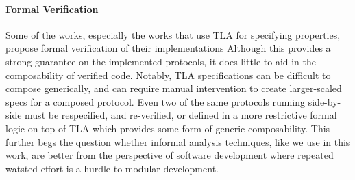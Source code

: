 \paragraph{Formal Verification}
Some of the works, especially the works that use TLA for specifying properties,
propose formal verification of their implementations
\cite{hawblitze2015ironfleet, bolosky2007farsite} Although this provides a
strong guarantee on the implemented protocols, it does little to aid in the
composability of verified code.  Notably, TLA specifications can be difficult
to compose generically, and can require manual intervention to create
larger-scaled specs for a composed protocol.  Even two of the same protocols
running side-by-side must be respecified, and re-verified, or defined in a more
restrictive formal logic on top of TLA which provides some form of generic
composability.  This further begs the question whether informal analysis
techniques, like we use in this work, are better from the perspective of
software development where repeated watsted effort is a hurdle to modular
development.

